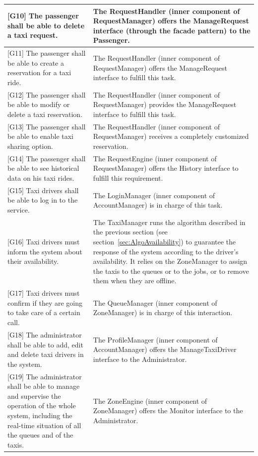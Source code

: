 \documentclass[a4paper,11pt]{report} %
\begin{document}
\begin{center}
\begin{longtable}{| p{7cm} | p{8cm} |}
			{[}G10{]} The passenger shall be able to delete a taxi request. & The RequestHandler (inner component of RequestManager) offers the ManageRequest interface (through the facade pattern) to the Passenger.\\\hline	
			{[}G11{]} The passenger shall be able to create a reservation for a taxi ride. & The RequestHandler (inner component of RequestManager) offers the ManageRequest interface to fulfill this task.\\\hline
			{[}G12{]} The passenger shall be able to modify or delete a taxi reservation.	& The RequestHandler (inner component of RequestManager) provides the ManageRequest interface to fulfill this task.\\\hline
			{[}G13{]} The passenger shall be able to enable taxi sharing option. & The RequestHandler (inner component of RequestManager) receives a completely customized reservation.\\\hline
			{[}G14{]} The passenger shall be able to see historical data on his taxi rides. & The RequestEngine (inner component of RequestManager) offers the History interface to fulfill this requirement.\\\hline
			{[}G15{]} Taxi drivers shall be able to log in to the service. & The LoginManager (inner component of AccountManager) is in charge of this task.\\\hline	
			{[}G16{]} Taxi drivers must inform the system about their availability. & The TaxiManager runs the algorithm described in the previous section (see section~\ref{sec:AlgoAvailability}) to guarantee the response of the system according to the driver's availability. It relies on the ZoneManager to assign the taxis to the queues or to the jobs, or to remove them when they are offline.\\\hline
			{[}G17{]} Taxi drivers must confirm if they are going to take care of a certain call. & The QueueManager (inner component of ZoneManager) is in charge of this interaction.\\\hline
			{[}G18{]} The administrator shall be able to add, edit and delete taxi drivers in the system. & The ProfileManager (inner component of AccountManager) offers the ManageTaxiDriver interface to the Administrator.\\\hline
			{[}G19{]} The administrator shall be able to manage and supervise the operation of the whole system, including the real-time situation of all the queues and of the taxis. & The ZoneEngine (inner component of ZoneManager) offers the Monitor interface to the Administrator.\\\hline
			
		\end{longtable}
	\end{center} 
	
\end{document}
